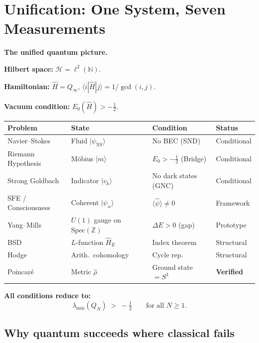 \documentclass[12pt]{article}
\newcommand{\ket}[1]{|{#1}\rangle}
\newcommand{\bra}[1]{\langle{#1}|}
\newcommand{\Hil}{\mathcal{H}}
\newcommand{\half}{\tfrac{1}{2}}
\begin{document}
\section{Unification: One System, Seven Measurements}
\label{sec:unification}

\begin{tcolorbox}[masterbox]
\textbf{The unified quantum picture.}

\textbf{Hilbert space:} $\Hil = \ell^2(\mathbb{N})$.

\textbf{Hamiltonian:} $\hat{H} = Q_\infty$,
$\bra{i}\hat{H}\ket{j} = 1/\gcd(i,j)$.

\textbf{Vacuum condition:} $E_0(\hat{H}) > -\half$.

\medskip
\begin{center}
\renewcommand{\arraystretch}{1.6}
\small
\begin{tabular}{@{}p{2.8cm}p{3.2cm}p{3.0cm}p{2.4cm}@{}}
\toprule
\textbf{Problem} & \textbf{State} & \textbf{Condition} & \textbf{Status}\\
\midrule
Navier--Stokes &
  Fluid $\ket{\psi_{\mathrm{NS}}}$ &
  No BEC (SND) &
  Conditional \\
Riemann Hypothesis &
  M\"{o}bius $\ket{m}$ &
  $E_0>-\half$ (Bridge) &
  Conditional \\
Strong Goldbach &
  Indicator $\ket{v_k}$ &
  No dark states (GNC) &
  Conditional \\
SFE / Consciousness &
  Coherent $\ket{\psi_\alpha}$ &
  $\langle\hat{\psi}\rangle\ne0$ &
  Framework \\
Yang--Mills &
  $U(1)$ gauge on $\mathrm{Spec}(\mathbb{Z})$ &
  $\Delta E>0$ (gap) &
  Prototype \\
BSD &
  $L$-function $\hat{H}_E$ &
  Index theorem &
  Structural \\
Hodge &
  Arith.\ cohomology &
  Cycle rep.\ &
  Structural \\
Poincar\'{e} &
  Metric $\hat{\rho}$ &
  Ground state $=S^3$ &
  \textbf{Verified} \\
\bottomrule
\end{tabular}
\end{center}

\bigskip
\textbf{All conditions reduce to:}
\[
  \boxed{\lambda_{\min}(Q_N) \;>\; -\half \qquad \text{for all } N\ge1.}
\]
\end{tcolorbox}

\subsection{Why quantum succeeds where classical fails}
\end{document}
